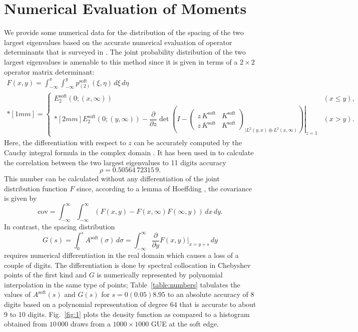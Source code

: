 \documentclass[10pt,reqno]{amsart}
\theoremstyle{plain}
\theoremstyle{definition}
\theoremstyle{remark}
\begin{document}
\section{Numerical Evaluation of Moments}\label{sect:numerical}
\setcounter{equation}{0}

We provide some numerical data for the distribution of the spacing of the two largest eigenvalues
based on the accurate numerical evaluation of operator determinants that is surveyed in \cite{MR2895091}.
The joint probability distribution of the two largest eigenvalues is amenable to this method since it is 
given in terms of a $2\times 2$ operator matrix determinant:
\begin{multline*}
F(x,y) = \int_{-\infty}^x\int_{-\infty}^y p^\text{soft}_{(2)}(\xi,\eta)\,d\xi\,d\eta\\*[1mm]
= \begin{cases}
E_2^\text{soft}(0;(x,\infty)) & (x {\leqslant} y),\\*[2mm]
E_2^\text{soft}(0;(y,\infty))  - \left.\dfrac{\partial}{\partial z} \det\left(I-
\begin{pmatrix}
z \,K^\text{soft} & K^\text{soft} \\
z \,K^\text{soft} & K^\text{soft}
\end{pmatrix}_{|L^2(y,x)\oplus L^2(x,\infty)}\right)\right|_{z=1} & (x > y).
\end{cases}
\end{multline*}
Here, the differentiation with respect to $z$ can be accurately computed by the Cauchy integral formula in the
complex domain \cite{MR2754188}. It has been used in \cite{MR2895091} to calculate the correlation between the
two largest eigenvalues to 11 digits accuracy
\[
\rho = 0.50564\,72315\,9.
\]
This number can be calculated without any differentiation of the joint distribution function $F$ since,
according to a  lemma of Hoeffding \cite{Hoeffding}, the covariance is given by 
\[
\text{cov} = \int_{-\infty}^\infty \int_{-\infty}^\infty (F(x,y)- F(x,\infty)F(\infty,y))\,dx\,dy.
\]
In contrast, the spacing distribution
\[
G(s) = \int_0^s A^\text{soft}(\sigma)\,d\sigma = \int_{-\infty}^\infty \frac{\partial }{\partial y} F(x,y)|_{x=y+s}\,dy
\]
requires numerical differentiation in the real domain which causes a loss of a couple of digits. The differentiation
is done by spectral collocation in Chebyshev points of the first kind and $G$ is numerically represented by polynomial 
interpolation in the same type of points; Table~\ref{table:numbers} tabulates the values of $A^\text{soft}(s)$ and 
$G(s)$ for $s=0(0.05)8.95$ to an absolute accuracy of 8 digits based on a polynomial representation of degree $64$ that 
is accurate to about 9 to 10 digits. Fig.~\ref{fig:1} plots the density function as compared to a histogram obtained 
from $10\,000$ draws from a $1000\times 1000$ GUE at the soft edge.
\end{document}
